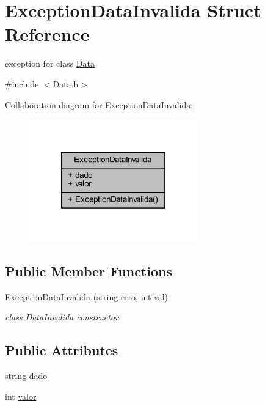 \hypertarget{struct_exception_data_invalida}{}\section{Exception\+Data\+Invalida Struct Reference}
\label{struct_exception_data_invalida}


exception for class \hyperlink{class_data}{Data}  




{\ttfamily \#include $<$Data.\+h$>$}



Collaboration diagram for Exception\+Data\+Invalida\+:\nopagebreak
\begin{figure}[H]
\begin{center}
\leavevmode
\includegraphics[width=206pt]{struct_exception_data_invalida__coll__graph}
\end{center}
\end{figure}
\subsection*{Public Member Functions}
\begin{DoxyCompactItemize}
\item 
\hyperlink{struct_exception_data_invalida_a70ace8e27f317a4d1995c2744a93964a}{Exception\+Data\+Invalida} (string erro, int val)
\begin{DoxyCompactList}\small\item\em class Data\+Invalida constructor. \end{DoxyCompactList}\end{DoxyCompactItemize}
\subsection*{Public Attributes}
\begin{DoxyCompactItemize}
\item 
string \hyperlink{struct_exception_data_invalida_a4856178b04ae4fda6cb2f3ce87040bf3}{dado}
\item 
int \hyperlink{struct_exception_data_invalida_ac9865bf078e2d0b7d36aa81fced67967}{valor}
\end{DoxyCompactItemize}


